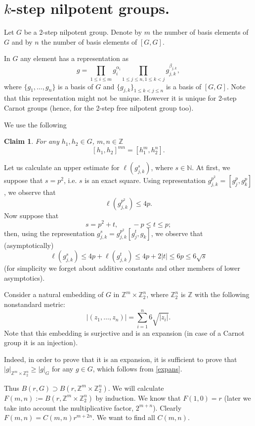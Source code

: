 \documentclass[11pt]{article}
\newcounter{razdel}[section]
\theoremstyle{Mystyle}
\newtheorem{Claim}[razdel]{Claim}
\begin{document}
\section{$k$-step nilpotent groups.}

Let $G$ be a $2$-step nilpotent group. Denote by $m$ the number of basis elements of $G$ and by $n$ the number of basis elements of $[G,G]$.

In $G$ any element has a representation as
$$g = \prod_{1\leq i\leq m}g_i^{\alpha_i}\prod_{1\leq j\leq n,1\leq k<j} g_{j,k}^{\beta_{j,k}},$$
where $\{g_1,\ldots, g_n\}$ is a basis of $G$ and $\{g_{j,k}\}_{1\leq k<j\leq n}$ is a basis of $[G,G]$. 
Note that this representation might not be unique. However it is unique for 2-step Carnot groups (hence, for the 2-step free nilpotent group too).

We use the following

\begin{Claim}
\label{Cl0}
 For any $h_1,h_2\in G$, $m,n\in\mathbb{Z}$ 
$$[h_1,h_2]^{mn} = [h_1^{m},h_2^{n}].$$
\end{Claim}

Let us calculate an upper estimate for $\ell(g_{j,k}^s)$, where $s\in\mathbb{N}$. At first, we suppose that $s=p^2$, i.e. $s$ is an exact square. Using representation 
$g_{j,k}^{p^2} = [g_{j}^{p},g_{k}^{p}]$, we observe that
$$\ell(g_{j,k}^{p^2}) \leq 4p.$$
Now suppose that
$$s=p^2+t,\qquad -p\leq t\leq p;$$
then, using the representation $g_{j,k}^{s}=g_{j,k}^{p^2}[g_{j}^{t},g_{k}]$, we observe that (asymptotically)
\begin{equation}
\label{expans}
\ell(g_{j,k}^{s})\leq 4p + \ell(g_{j,k}^t)\leq 4p + 2|t|\leq 6p\leq 6\sqrt{s}
\end{equation}
(for simplicity we forget about additive constants and other members of lower asymptotics).

Consider a natural embedding of $G$ in $\mathbb{Z}^{m}\times\mathbb{Z}_{2}^{n}$, where  
$\mathbb{Z}_{2}^{n}$ is $\mathbb{Z}$ with the following nonstandard metric:
$$|(z_1,\ldots,z_n)| = \sum_{i=1}^{n}6\sqrt{|z_i|}.$$
Note that this embedding is surjective and is an expansion (in case of a Carnot group it is an injection). 

Indeed, in order to prove that it is an expansion, it is sufficient to prove that
$|g|_{\mathbb{Z}^{m}\times\mathbb{Z}_{2}^{n}}\geq |g|_{G}$ for any $g\in G$, which follows from \eqref{expans}.

Thus $B(r,G)\supset B(r, \mathbb{Z}^{m}\times\mathbb{Z}_{2}^{n})$. We will calculate
$F(m,n) := B(r,\mathbb{Z}^{m}\times\mathbb{Z}_{2}^{n})$ by induction.
 We know that $F(1,0) = r$ (later we take into account the multiplicative factor, $2^{m+n}$). Clearly $F(m,n) = C(m,n)r^{m+2n}$. We want to find all $C(m,n)$.
\end{document}

